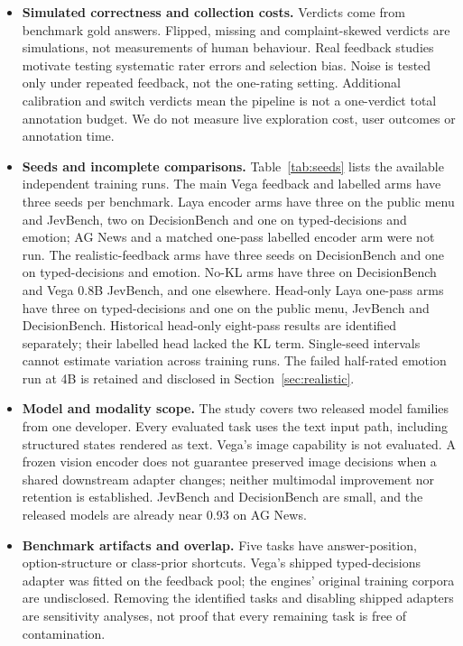 \begin{itemize}
\item \textbf{Simulated correctness and collection costs.} Verdicts come from benchmark gold answers. Flipped, missing and complaint-skewed verdicts are simulations, not measurements of human behaviour. Real feedback studies~\citep{kreutzer2018ebay,gao2023continually} motivate testing systematic rater errors and selection bias. Noise is tested only under repeated feedback, not the one-rating setting. Additional calibration and switch verdicts mean the pipeline is not a one-verdict total annotation budget. We do not measure live exploration cost, user outcomes or annotation time.
\item \textbf{Seeds and incomplete comparisons.} Table~\ref{tab:seeds} lists the available independent training runs. The main Vega feedback and labelled arms have three seeds per benchmark. Laya encoder arms have three on the public menu and JevBench, two on DecisionBench and one on typed-decisions and emotion; AG News and a matched one-pass labelled encoder arm were not run. The realistic-feedback arms have three seeds on DecisionBench and one on typed-decisions and emotion. No-KL arms have three on DecisionBench and Vega 0.8B JevBench, and one elsewhere. Head-only Laya one-pass arms have three on typed-decisions and one on the public menu, JevBench and DecisionBench. Historical head-only eight-pass results are identified separately; their labelled head lacked the KL term. Single-seed intervals cannot estimate variation across training runs. The failed half-rated emotion run at 4B is retained and disclosed in Section~\ref{sec:realistic}.
\item \textbf{Model and modality scope.} The study covers two released model families from one developer. Every evaluated task uses the text input path, including structured states rendered as text. Vega's image capability is not evaluated. A frozen vision encoder does not guarantee preserved image decisions when a shared downstream adapter changes; neither multimodal improvement nor retention is established. JevBench and DecisionBench are small, and the released models are already near 0.93 on AG News.
\item \textbf{Benchmark artifacts and overlap.} Five tasks have answer-position, option-structure or class-prior shortcuts. Vega's shipped typed-decisions adapter was fitted on the feedback pool; the engines' original training corpora are undisclosed. Removing the identified tasks and disabling shipped adapters are sensitivity analyses, not proof that every remaining task is free of contamination.

\end{itemize}
